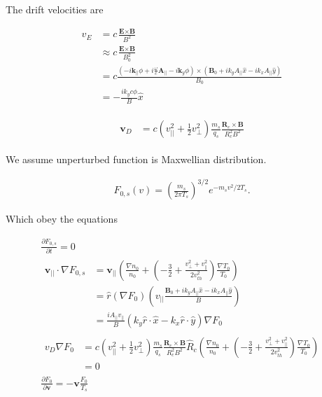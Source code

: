 The drift velocities are \cite{Vd}

\begin{equation}
    \begin{aligned}
      v_E{}&=c\frac{\textbf{E}\times \textbf{B}}{B^2}\\
      &\approx c\frac{\textbf{E}\times \textbf{B}}{B_0^2}\\
      &=c\frac{\left(-i\textbf{k}_{||}\phi +i\frac{\omega}{c} \textbf{A}_{||}-i\textbf{k}_{y}\phi\right)
      \times 
      \left(\textbf{B}_0+ik_yA_{||}\hat{x}-ik_xA_{||}\hat{y}\right)
      }{B_0}\\
      &=-\frac{ik_yc\phi}{B}\hat{x}
    \end{aligned}
\end{equation}

\begin{eqnarray}
     \begin{aligned}
     \textbf{v}_D{}&=c(v^2_{||}+\frac{1}{2}v^2_{\perp})\frac{m_s}{q_s}\frac{\textbf{R}_c \times \textbf{B}}{R_c^2 B^2}
     \end{aligned}
\end{eqnarray}

We assume unperturbed function is Maxwellian distribution. 

\begin{eqnarray}
     F_{0,s}(v)=\left(\frac{m_s}{2\pi T_s}\right)^{3/2}e^{-m_sv^2/2T_s}.
\end{eqnarray}

Which obey the equations

\begin{eqnarray}
     \frac{\partial F_{0,s}}{\partial t}=0\\
     \begin{aligned}
     \textbf{v}_{||}\cdot \nabla F_{0,s}{}&=\textbf{v}_{||}(\frac{\nabla n_{0}}{n_{0}}+\left(-\frac{3}{2}+\frac{v_{\perp}^{2}+v_{ \|}^{2}}{2 v_{t h}^{2}}\right)
     \frac{\nabla T_{0}}{T_{0}})\\
     &=\hat{r}(\nabla F_0) \left(v_{||}\frac{\textbf{B}_0+ik_yA_{||}\hat{x}-ik_xA_{||}\hat{y}
       }{B}\right)\\
     &=\frac{iA_{||}v_{||}}{B}\left(k_y\hat{r}\cdot\hat{x}-k_x\hat{r}\cdot\hat{y}\right)\nabla F_0
     \end{aligned}\\
     \begin{aligned}
     v_D\nabla F_0{}&=c(v^2_{||}+\frac{1}{2}v^2_{\perp})\frac{m_s}{q_s}\frac{\textbf{R}_c \times \textbf{B}}{R_c^2 B^2}
     \hat{R}_c(\frac{\nabla n_{0}}{n_{0}}+\left(-\frac{3}{2}+\frac{v_{\perp}^{2}+v_{ \|}^{2}}{2 v_{t h}^{2}}\right)
     \frac{\nabla T_{0}}{T_{0}})\\
     &=0
     \label{eq:vdf}
     \end{aligned}\\
    \frac{\partial F_0}{\partial \textbf{v}} =-\textbf{v}\frac{F_0}{T_s}
\end{eqnarray}

